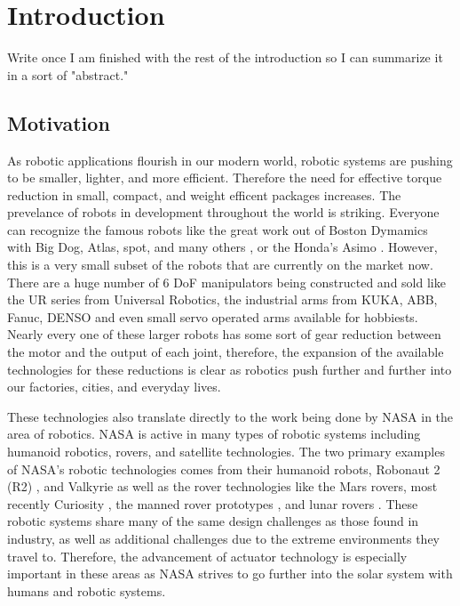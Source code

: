 
\chapter{Introduction}\label{ch:intro}
Write once I am finished with the rest of the introduction so I can summarize it in a sort of "abstract." 

\section{Motivation} \label{intro:motivation}

As robotic applications flourish in our modern world, robotic systems are pushing to be smaller, lighter, and more efficient. 
Therefore the need for effective torque reduction in small, compact, and weight efficent packages increases. 
The prevelance of robots in development throughout the world is striking. 
Everyone can recognize the famous robots like the great work out of Boston Dymamics with Big Dog, Atlas, spot, and many others \cite{ref/boston_dynamics}, or the Honda's Asimo \cite{ref/asimo}.  
However, this is a very small subset of the robots that are currently on the market now. 
There are a huge number of 6 DoF manipulators being constructed and sold like the UR series from Universal Robotics, the industrial arms from KUKA, ABB, Fanuc, DENSO and even small servo operated arms available for hobbiests. 
Nearly every one of these larger robots has some sort of gear reduction between the motor and the output of each joint, therefore, the expansion of the available technologies for these reductions is clear as robotics push further and further into our factories, cities, and everyday lives. 

These technologies also translate directly to the work being done by NASA in the area of robotics. 
NASA is active in many types of robotic systems including humanoid robotics, rovers, and satellite technologies. 
The two primary examples of NASA's robotic technologies comes from their humanoid robots, Robonaut 2 (R2) \cite{ref:r2}, and Valkyrie \cite{valkyrie} as well as the rover technologies like the Mars rovers, most recently Curiosity \cite{ref:curiosity}, the manned rover prototypes \cite{ref:rover}, and lunar rovers \cite{ref:RP}. 
These robotic systems share many of the same design challenges as those found in industry, as well as additional challenges due to the extreme environments they travel to. Therefore, the advancement of actuator technology is especially important in these areas as NASA strives to go further into the solar system with humans and robotic systems. 

